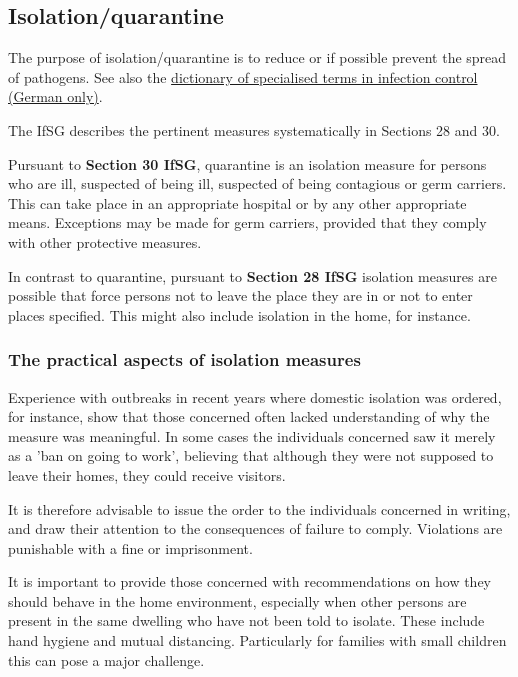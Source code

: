 \documentclass{article}
\begin{document}
\subsection{Isolation/quarantine}\label{H197696}



The purpose of isolation/quarantine is to reduce or if possible prevent the spread of pathogens. See also the \href{https://www.rki.de/DE/Content/Service/Publikationen/Fachwoerterbuch_Infektionsschutz.pdf}{dictionary of specialised terms in infection control (German only)}.


The IfSG describes the pertinent measures systematically in Sections 28 and 30.


Pursuant to \textbf{Section 30 IfSG}, quarantine is an isolation measure for persons who are ill, suspected of being ill, suspected of being contagious or germ carriers. This can take place in an appropriate hospital or by any other appropriate means. Exceptions may be made for germ carriers, provided that they comply with other protective measures.


In contrast to quarantine, pursuant to\textbf{ Section 28 IfSG} isolation measures are possible that force persons not to leave the place they are in or not to enter places specified. This might also include isolation in the home, for instance.


\subsubsection{The practical aspects of isolation measures}\label{H9438674}



Experience with outbreaks in recent years where domestic isolation was ordered, for instance, show that those concerned often lacked understanding of why the measure was meaningful. In some cases the individuals concerned saw it merely as a 'ban on going to work', believing that although they were not supposed to leave their homes, they could receive visitors.


It is therefore advisable to issue the order to the individuals concerned in writing, and draw their attention to the consequences of failure to comply. Violations are punishable with a fine or imprisonment.


It is important to provide those concerned with recommendations on how they should behave in the home environment, especially when other persons are present in the same dwelling who have not been told to isolate. These include hand hygiene and mutual distancing. Particularly for families with small children this can pose a major challenge.
\end{document}
